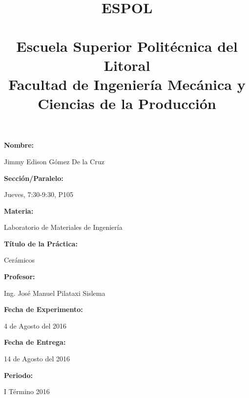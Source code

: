\documentclass[a4paper,11pt]{article}
\begin{document}
\posttitle{\end{center}}
\title{\LARGE \textbf {ESPOL\\ \ \\Escuela Superior Polit\'ecnica del Litoral} \\ \mdseries Facultad de Ingenier\'ia Mec\'anica y Ciencias de la Producci\'on}
\date{}
\maketitle
\vspace{-1.5cm}
\hspace{1cm} \Large{ \textbf {Nombre:}}
\begin{center}
Jimmy Edison G\'omez De la Cruz
\end{center}
\hspace{1.5cm} \Large{ \textbf {Secci\'on/Paralelo:}}
\begin{center}
Jueves, 7:30-9:30, P105
\end{center}
\hspace{1.7cm} \Large {\textbf {Materia:}}
\begin{center}
Laboratorio de Materiales de Ingenier\'ia
\end{center}
\hspace{1.5cm} \Large{ \textbf {T\'itulo de la Pr\'actica:}}
\begin{center}
Cerámicos
\end{center}
\hspace{1.5cm} \Large{ \textbf {Profesor:}}
\begin{center}
Ing. Jos\'e Manuel Pilataxi Sislema
\end{center}
\hspace{1.5cm} \Large{ \textbf {Fecha de Experimento:}}
\begin{center}
4 de Agosto del 2016
\end{center}
\hspace{1.5cm} \Large{ \textbf {Fecha de Entrega:}}
\begin{center}
14 de Agosto del 2016
\end{center}
\hspace{1.7cm} \Large{\textbf {Periodo:}}
\begin{center}
I T\'ermino 2016
\end{center}
\thispagestyle{empty}
\end{document}
